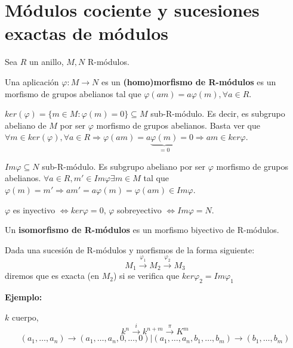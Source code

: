 \section{Módulos cociente y sucesiones exactas de módulos}

Sea $R$ un anillo, $M,N$ R-módulos.

\begin{Def}
Una aplicación $\varphi : M\rightarrow N$ es un \textbf{(homo)morfismo de R-módulos} es un morfismo de grupos abelianos tal que $\varphi(am)=a\varphi(m),\forall a \in R$.
\end{Def}

\begin{nota}
$ker(\varphi)=\{m\in M : \varphi(m)=0 \}\subseteq M$ sub-R-módulo. Es decir, es subgrupo abeliano de $M$ por ser $\varphi$ morfismo de grupos abelianos. Basta ver que $\forall m \in ker(\varphi),\forall a \in R \Rightarrow \varphi(am)=a\underbrace{\varphi(m)}_{=0}=0\Rightarrow am\in ker\varphi$. 
\end{nota}

\begin{nota}
$Im \varphi\subseteq N$ sub-R-módulo. Es subgrupo abeliano por ser $\varphi$ morfismo de grupos abelianos. $\forall a\in R, m'\in Im\varphi \exists m\in M$ tal que $\varphi(m)=m' \Rightarrow am'=a\varphi(m)=\varphi(am)\in Im \varphi$. 
\end{nota}

\begin{nota}
$\varphi$ es inyectivo $\Leftrightarrow ker \varphi =0$, $\varphi$ sobreyectivo $\Leftrightarrow Im \varphi = N$. 
\end{nota}


\begin{Def}
Un \textbf{isomorfismo de R-módulos} es un morfismo biyectivo de R-módulos. 
\end{Def}


\begin{Def}
Dada una sucesión de R-módulos y morfismos de la forma siguiente:
$$M_1\xrightarrow{\varphi_1}M_2 \xrightarrow{\varphi_2}M_3   $$
diremos que es exacta (en $M_2$) si se verifica que $ker \varphi_2=Im \varphi_1$
\end{Def}


\textbf{Ejemplo: }

$k$ cuerpo, 
$$k^n \xrightarrow{i} k^{n+m} \xrightarrow{\pi} K^m $$
$$(a_1,\dots,a_n)\rightarrow (a_1,\dots,a_n,0,\dots,0) | (a_1,\dots,a_n,b_1,\dots,b_m)\rightarrow (b_1,\dots,b_m) $$


